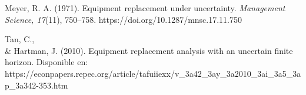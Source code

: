 \documentclass[12pt]{article}
\begin{document}
\newpage
\begin{thebibliography}{9}
 Meyer, R. A. (1971). Equipment replacement under uncertainty. \textit{Management Science, 17}(11), 750--758. https://doi.org/10.1287/mnsc.17.11.750

 Tan, C., \\& Hartman, J. (2010). Equipment replacement analysis with an uncertain finite horizon. Disponible en: https://econpapers.repec.org/article/tafuiiexx/v\_3a42\_3ay\_3a2010\_3ai\_3a5\_3ap\_3a342-353.htm

\end{thebibliography}
\end{document}
